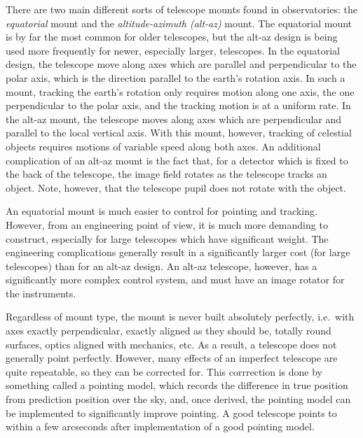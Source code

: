 \documentclass[12pt]{article}
\begin{document}
There are two main different sorts of telescope mounts found in
observatories: the \emph{equatorial} mount and the
\emph{altitude-azimuth (alt-az)}
mount. The equatorial mount is by far the most common for older
telescopes, but the alt-az design is being used more frequently for
newer, especially larger, telescopes. In the equatorial design, the
telescope move along axes which are parallel and perpendicular to the
polar axis, which is the direction parallel to the earth's rotation
axis. In such a mount, tracking the earth's rotation only requires
motion along one axis, the one perpendicular to the polar axis, and
the tracking motion is at a uniform rate. In the alt-az mount, the
telescope moves along axes which are perpendicular and parallel to the
local vertical axis. With this mount, however, tracking of celestial
objects requires motions of variable speed along both axes. An
additional complication of an alt-az mount is the fact that, for a
detector which is fixed to the back of the telescope, the image field
rotates as the telescope tracks an object. Note, however, that the
telescope pupil does not rotate with the object.

An equatorial mount is much easier to control for pointing and
tracking. However, from an engineering point of view, it is much more
demanding to construct, especially for large telescopes which have
significant weight. The engineering complications generally result in
a significantly larger cost (for large telescopes) than for an alt-az
design. An alt-az telescope, however, has a significantly more complex
control system, and must have an image rotator for the instruments.

Regardless of mount type, the mount is never built absolutely
perfectly, i.e.\ with axes exactly perpendicular, exactly aligned as
they should be, totally round surfaces, optics aligned with mechanics,
etc. As a result, a telescope does not generally point perfectly.
However, many effects of an imperfect telescope are quite repeatable,
so they can be corrected for. This corrrection is done by something
called a pointing model, which records the difference in true position
from prediction position over the sky, and, once derived, the pointing
model can be implemented to significantly improve pointing. A good
telescope points to within a few arcseconds after implementation of a
good pointing model.
\end{document}
